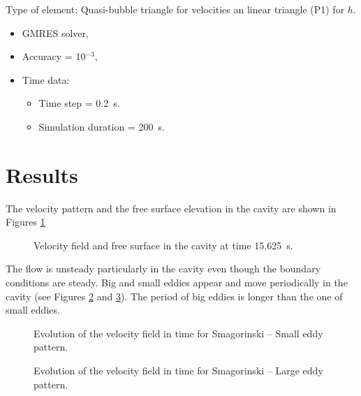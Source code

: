 Type of element: Quasi-bubble triangle for velocities an linear triangle (P1) for $h$.

\begin{itemize}
\item GMRES solver,
\item Accuracy = 10$^{-3}$,
\item Time data:
  \begin{itemize}
\item Time step = 0.2~s.
\item Simulation duration = 200~s.
  \end{itemize}
\end{itemize}

\section{Results}
The velocity pattern and the free surface elevation in the cavity are shown in
Figures \ref{fig:cavity:vel_prof}
\begin{figure}
 \centering
{}
 \caption{Velocity field and free surface in the cavity at time 15,625~s.}\label{fig:cavity:vel_prof}
\end{figure}

The flow is unsteady particularly in the cavity even though the boundary
conditions are steady. Big and small eddies appear and move periodically in
the cavity (see Figures \ref{fig:cavity:evol_small} and \ref{fig:cavity:evol_large}).
The period of big eddies is longer than the one of small eddies.

\begin{figure}
 \centering
{}
 \caption{Evolution of the velocity field in time for Smagorinski -- Small eddy pattern.}\label{fig:cavity:evol_small}
\end{figure}

\begin{figure}
 \centering
{}
 \caption{Evolution of the velocity field in time for Smagorinski -- Large eddy pattern.}\label{fig:cavity:evol_large}
\end{figure}

